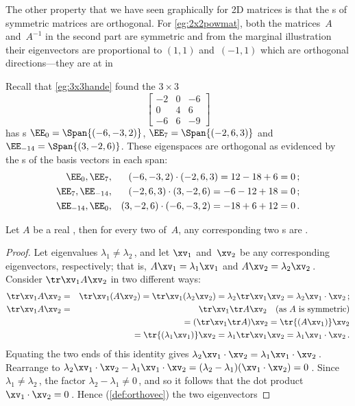 The other property that we have seen graphically for 2D matrices is that the s of symmetric matrices are orthogonal.
For \cref{eg:2x2powmat}, both the matrices~\(A\) and~\(A^{-1}\) in 
the second part are symmetric and from the marginal illustration their eigenvectors are proportional to \((1,1)\) and~\((-1,1)\) which are orthogonal directions---they are at  in 

\begin{example} 
Recall that \cref{eg:3x3hande} found the \(3\times3\) 
\begin{equation*}
\begin{bmatrix} -2&0&-6\\0&4&6\\-6&6&-9 \end{bmatrix}
\end{equation*}
has s \(\EE_0=\Span\{(-6,-3,2)\}\), \(\EE_7=\Span\{(-2,6,3)\}\) and \(\EE_{-14}=\Span\{(3,-2,6)\}\).
These eigenspaces are orthogonal as evidenced by the s of the basis vectors in each span:
\begin{eqnarray*}
\EE_0,\EE_7,&&
(-6,-3,2)\cdot(-2,6,3)=12-18+6=0\,;
\\
\EE_7,\EE_{-14},&&
(-2,6,3)\cdot(3,-2,6)=-6-12+18=0\,;
\\
\EE_{-14},\EE_0,&&
(3,-2,6)\cdot(-6,-3,2)=-18+6+12=0\,.
\end{eqnarray*}
\end{example}




\begin{theorem} \label{thm:orthoevec} 
Let \(A\) be a real , then for every two  of~\(A\), any corresponding two s are .
\end{theorem}
\begin{proof} 
Let eigenvalues \(\lambda_1\neq\lambda_2\)\,, and let \(\xv_1\) and~\(\xv_2\) be any corresponding eigenvectors, respectively; that is, \(A\xv_1=\lambda_1\xv_1\) and \(A\xv_2=\lambda_2\xv_2\)\,.
Consider \(\tr\xv_1A\xv_2\) in two different ways:
\begin{eqnarray*}
\tr\xv_1A\xv_2
&=&\tr\xv_1(A\xv_2)
=\tr\xv_1(\lambda_2\xv_2)
=\lambda_2\tr\xv_1\xv_2
=\lambda_2\xv_1\cdot\xv_2\,;
\\\tr\xv_1A\xv_2&=&\tr\xv_1\tr A\xv_2\quad\text{(as \(A\) is symmetric)}
\\&&{}=(\tr\xv_1\tr A)\xv_2
=\tr{(A\xv_1)}\xv_2
\\&&{}=\tr{(\lambda_1\xv_1)}\xv_2
=\lambda_1\tr\xv_1\xv_2
=\lambda_1\xv_1\cdot\xv_2\,.
\end{eqnarray*}
Equating the two ends of this identity gives \(\lambda_2\xv_1\cdot\xv_2=\lambda_1\xv_1\cdot\xv_2\)\,.
Rearrange to \(\lambda_2\xv_1\cdot\xv_2-\lambda_1\xv_1\cdot\xv_2
=(\lambda_2-\lambda_1)(\xv_1\cdot\xv_2)=0\)\,.
Since \(\lambda_1\neq\lambda_2\)\,, the factor \(\lambda_2-\lambda_1\neq0\)\,, and so it follows that the dot product \(\xv_1\cdot\xv_2=0\)\,.
Hence (\cref{def:orthovec}) the two eigenvectors 
\end{proof}



